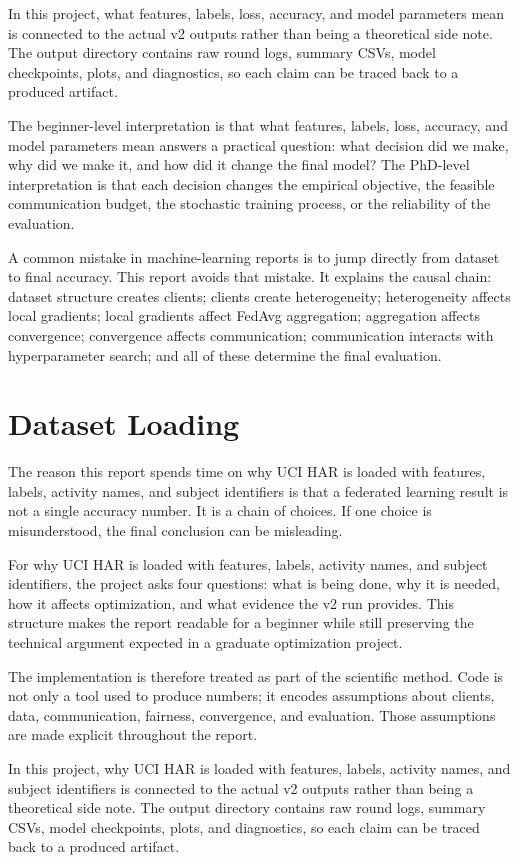 \documentclass[11pt]{report}
\begin{document}
In this project, what features, labels, loss, accuracy, and model parameters mean is connected to
the actual v2 outputs rather than being a theoretical side note. The output directory contains raw
round logs, summary CSVs, model checkpoints, plots, and diagnostics, so each claim can be traced
back to a produced artifact.

The beginner-level interpretation is that what features, labels, loss, accuracy, and model
parameters mean answers a practical question: what decision did we make, why did we make it, and how
did it change the final model? The PhD-level interpretation is that each decision changes the
empirical objective, the feasible communication budget, the stochastic training process, or the
reliability of the evaluation.

A common mistake in machine-learning reports is to jump directly from dataset to final accuracy.
This report avoids that mistake. It explains the causal chain: dataset structure creates clients;
clients create heterogeneity; heterogeneity affects local gradients; local gradients affect FedAvg
aggregation; aggregation affects convergence; convergence affects communication; communication
interacts with hyperparameter search; and all of these determine the final evaluation.

\chapter{Dataset Loading}
The reason this report spends time on why UCI HAR is loaded with features, labels, activity names,
and subject identifiers is that a federated learning result is not a single accuracy number. It is a
chain of choices. If one choice is misunderstood, the final conclusion can be misleading.

For why UCI HAR is loaded with features, labels, activity names, and subject identifiers, the
project asks four questions: what is being done, why it is needed, how it affects optimization, and
what evidence the v2 run provides. This structure makes the report readable for a beginner while
still preserving the technical argument expected in a graduate optimization project.

The implementation is therefore treated as part of the scientific method. Code is not only a tool
used to produce numbers; it encodes assumptions about clients, data, communication, fairness,
convergence, and evaluation. Those assumptions are made explicit throughout the report.

In this project, why UCI HAR is loaded with features, labels, activity names, and subject
identifiers is connected to the actual v2 outputs rather than being a theoretical side note. The
output directory contains raw round logs, summary CSVs, model checkpoints, plots, and diagnostics,
so each claim can be traced back to a produced artifact.
\end{document}
